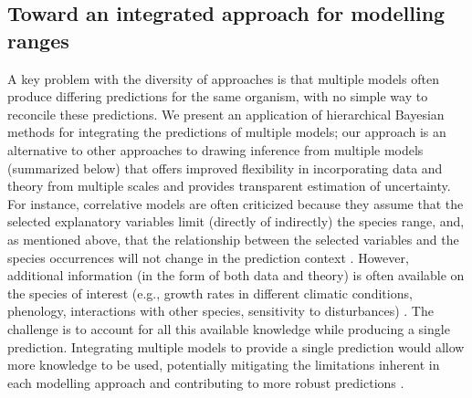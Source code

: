 \subsection*{Toward an integrated approach for modelling ranges}
A key problem with the diversity of approaches is that multiple models often produce differing predictions for the same organism, with no simple way to reconcile these predictions.
We present an application of hierarchical Bayesian methods for integrating the predictions of multiple models; our approach is an alternative to other approaches to drawing inference from multiple models (summarized below) that offers improved flexibility in incorporating data and theory from multiple scales and provides transparent estimation of uncertainty.
For instance, correlative models are often criticized because they assume that the selected explanatory variables limit (directly of indirectly) the species range, and, as mentioned above, that the relationship between the selected variables and the species occurrences will not change in the prediction context \citep{Araujo2006, Berteaux2006, Braunisch2013}.
However, additional information (in the form of both data and theory) is often available on the species of interest (e.g., growth rates in different climatic conditions, phenology, interactions with other species, sensitivity to disturbances) \citep{Holt2009, Thuiller2013}. 
The challenge is to account for all this available knowledge while producing a single prediction.
Integrating multiple models to provide a single prediction would allow more knowledge to be used, potentially mitigating the limitations inherent in each modelling approach and contributing to more robust predictions \citep{Pearson2003, Guisan2005, Araujo2006, Quillet2010}.

